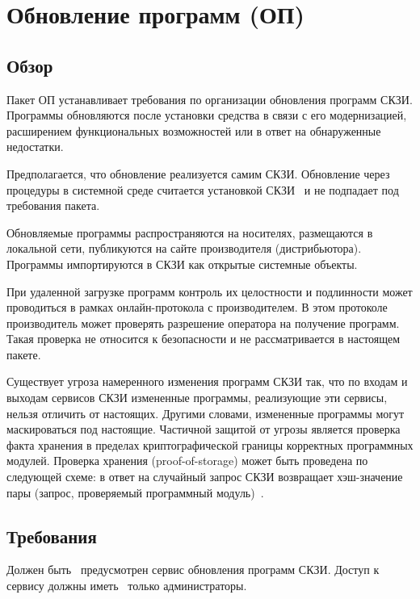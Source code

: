 \section{Обновление программ (ОП)}\label{SU}

\subsection{Обзор}\label{SU.Intro}

Пакет ОП устанавливает требования по организации обновления программ СКЗИ.
Программы обновляются после установки средства в связи с его модернизацией, 
расширением функциональных возможностей или в ответ на обнаруженные недостатки.

Предполагается, что обновление реализуется самим СКЗИ. Обновление через 
процедуры в системной среде считается установкой СКЗИ~ 
и не подпадает под требования пакета.

Обновляемые программы распространяются на  носителях,
размещаются в локальной сети, публикуются на сайте производителя
(дистрибьютора).
%
Программы импортируются в СКЗИ как открытые системные объекты.

При удаленной загрузке программ контроль их целостности и подлинности 
может проводиться в рамках онлайн-протокола с производителем. В этом протоколе
производитель может проверять разрешение оператора на получение программ. 
Такая проверка не относится к безопасности и не рассматривается в настоящем 
пакете.

Существует угроза намеренного изменения программ СКЗИ так, что по
входам и выходам сервисов СКЗИ измененные программы, реализующие эти сервисы, 
нельзя отличить от настоящих. Другими словами, измененные программы могут 
маскироваться под настоящие. Частичной защитой от угрозы является проверка 
факта хранения в пределах криптографической границы корректных программных 
модулей. Проверка хранения (proof-of-storage) может быть проведена по следующей 
схеме: в ответ на случайный запрос СКЗИ возвращает хэш-значение пары (запрос, 
проверяемый программный модуль)~.

\subsection{Требования}\label{SU.Reqs}

\label{R.SU.Service}
Должен быть~ предусмотрен сервис обновления 
программ СКЗИ. Доступ к сервису должны иметь~ 
только администраторы.

